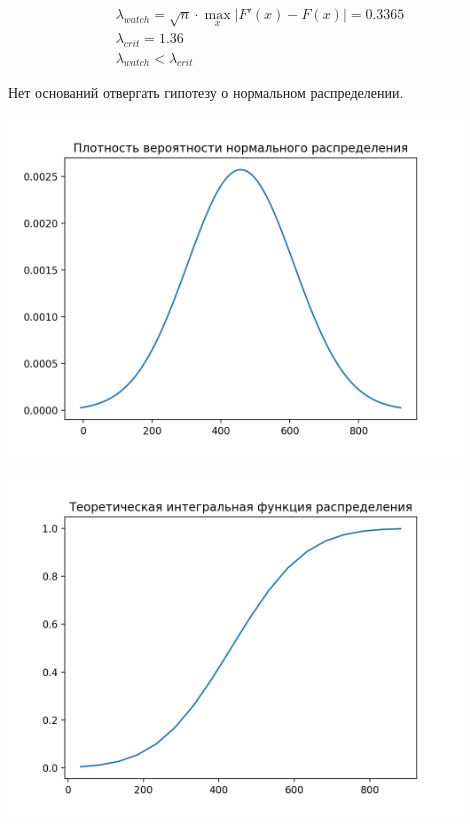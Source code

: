 \begin{gather*}
    \lambda_{watch} = \sqrt{n}\cdot\max_{x}\left| F{}'(x) - F(x) \right| = 0.3365\\
    \lambda_{crit} = 1.36\\
    \lambda_{watch} < \lambda_{crit}
\end{gather*}

Нет оснований отвергать гипотезу о нормальном распределении.

\includegraphics[width=0.9\textwidth]{src/gr21}

\includegraphics[width=0.9\textwidth]{src/gr22}
